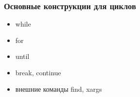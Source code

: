 \begin{frame}
\frametitle{Основные конструкции для циклов}
  \begin{itemize}
   \item while
   \item for
   \item until
   \item break, continue 
   \item внешние команды find, xargs 
  \end{itemize}
\end{frame}
